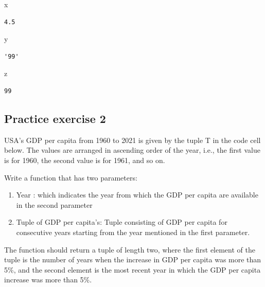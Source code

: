 \documentclass[
  letterpaper,
  DIV=11,
  numbers=noendperiod]{scrreprt}
\newenvironment{Shaded}{\begin{snugshade}}{\end{snugshade}}
\newcommand{\NormalTok}[1]{\textcolor[rgb]{0.00,0.23,0.31}{#1}}
\providecommand{\tightlist}{%
  \setlength{\itemsep}{0pt}\setlength{\parskip}{0pt}}\usepackage{longtable,booktabs,array}
\begin{document}
\begin{Shaded}
\begin{Highlighting}[]
\NormalTok{x}
\end{Highlighting}
\end{Shaded}

\begin{verbatim}
4.5
\end{verbatim}

\begin{Shaded}
\begin{Highlighting}[]
\NormalTok{y}
\end{Highlighting}
\end{Shaded}

\begin{verbatim}
'99'
\end{verbatim}

\begin{Shaded}
\begin{Highlighting}[]
\NormalTok{z}
\end{Highlighting}
\end{Shaded}

\begin{verbatim}
99
\end{verbatim}

\hypertarget{practice-exercise-2-3}{%
\subsection{Practice exercise 2}\label{practice-exercise-2-3}}

USA's GDP per capita from 1960 to 2021 is given by the tuple T in the
code cell below. The values are arranged in ascending order of the year,
i.e., the first value is for 1960, the second value is for 1961, and so
on.

Write a function that has two parameters:

\begin{enumerate}
\def\labelenumi{\arabic{enumi}.}
\tightlist
\item
  Year : which indicates the year from which the GDP per capita are
  available in the second parameter
\item
  Tuple of GDP per capita's: Tuple consisting of GDP per capita for
  consecutive years starting from the year mentioned in the first
  parameter.
\end{enumerate}

The function should return a tuple of length two, where the first
element of the tuple is the number of years when the increase in GDP per
capita was more than 5\%, and the second element is the most recent year
in which the GDP per capita increase was more than 5\%.
\end{document}
